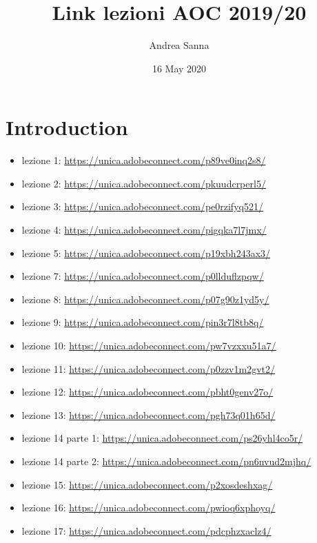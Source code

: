 \documentclass{article}
\title{Link lezioni AOC 2019/20}
\author{Andrea Sanna}
\date{16 May 2020}
\begin{document}
\maketitle

\section{Introduction}
\begin{itemize}
\item lezione 1: \url{https://unica.adobeconnect.com/p89ve0inq2s8/}\\
\item lezione 2: \url{https://unica.adobeconnect.com/pkuudcrperl5/}\\
\item lezione 3: \url{https://unica.adobeconnect.com/pe0rzifyq521/}\\
\item lezione 4: \url{https://unica.adobeconnect.com/pigqka7l7jmx/}\\
\item lezione 5: \url{https://unica.adobeconnect.com/p19xbh243ax3/}\\
\item lezione 7: \url{https://unica.adobeconnect.com/p0llduflzpqw/}\\
\item lezione 8: \url{https://unica.adobeconnect.com/p07g90z1yd5y/}\\
\item lezione 9: \url{https://unica.adobeconnect.com/pin3r7l8tb8q/}\\
\item lezione 10: \url{https://unica.adobeconnect.com/pw7vzxxu51a7/}\\
\item lezione 11: \url{https://unica.adobeconnect.com/p0zzv1m2gvt2/}\\
\item lezione 12: \url{https://unica.adobeconnect.com/pbht0genv27o/}\\
\item lezione 13: \url{https://unica.adobeconnect.com/pgh73q01h65d/}\\
\item lezione 14 parte 1: \url{https://unica.adobeconnect.com/ps26yhl4co5r/}\\
\item lezione 14 parte 2: \url{https://unica.adobeconnect.com/pn6nvud2mjhq/}\\
\item lezione 15: \url{https://unica.adobeconnect.com/p2xosdeshxag/}\\
\item lezione 16: \url{https://unica.adobeconnect.com/pwioq6xphoyq/}\\
\item lezione 17: \url{https://unica.adobeconnect.com/pdcphzxaclz4/}\\
\end{itemize}
\end{document}
